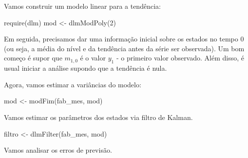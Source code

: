 \documentclass[
  letterpaper,
  DIV=11,
  numbers=noendperiod]{scrreprt}
\newenvironment{Shaded}{\begin{snugshade}}{\end{snugshade}}
\newcommand{\DecValTok}[1]{\textcolor[rgb]{0.68,0.00,0.00}{#1}}
\newcommand{\FunctionTok}[1]{\textcolor[rgb]{0.28,0.35,0.67}{#1}}
\newcommand{\NormalTok}[1]{\textcolor[rgb]{0.00,0.23,0.31}{#1}}
\newcommand{\OtherTok}[1]{\textcolor[rgb]{0.00,0.23,0.31}{#1}}
\newcommand{\SpecialCharTok}[1]{\textcolor[rgb]{0.37,0.37,0.37}{#1}}
\begin{document}
Vamos construir um modelo linear para a tendência:

\begin{Shaded}
\begin{Highlighting}[]
\FunctionTok{require}\NormalTok{(dlm)}
\NormalTok{mod }\OtherTok{\textless{}{-}} \FunctionTok{dlmModPoly}\NormalTok{(}\DecValTok{2}\NormalTok{)}
\end{Highlighting}
\end{Shaded}

Em seguida, precisamos dar uma informação inicial sobre os estados no
tempo \(0\) (ou seja, a média do nível e da tendência antes da série ser
observada). Um bom começo é supor que \(m_{1,0}\) é o valor \(y_1\) - o
primeiro valor observado. Além disso, é usual iniciar a análise supondo
que a tendência é nula.

\begin{Shaded}
\end{Shaded}

Agora, vamos estimar a variâncias do modelo:

\begin{Shaded}
\begin{Highlighting}[]
\NormalTok{mod }\OtherTok{\textless{}{-}} \FunctionTok{modFim}\NormalTok{(fab\_mes, mod)}
\end{Highlighting}
\end{Shaded}

Vamos estimar os parâmetros dos estados via filtro de Kalman.

\begin{Shaded}
\begin{Highlighting}[]
\NormalTok{filtro }\OtherTok{\textless{}{-}} \FunctionTok{dlmFilter}\NormalTok{(fab\_mes, mod)}
\end{Highlighting}
\end{Shaded}

Vamos analisar os erros de previsão.

\begin{Shaded}
\end{Shaded}
\end{document}
